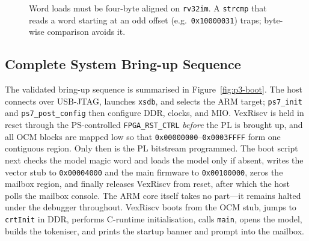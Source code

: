 \begin{figure}[H]
\centering
{}
\caption{Word loads must be four-byte aligned on \texttt{rv32im}. A \texttt{strcmp} that reads a word
starting at an odd offset (e.g.\ \texttt{0x10000031}) traps; byte-wise comparison avoids it.}
\label{fig:p3-trap}
\end{figure}

\subsection{Complete System Bring-up Sequence}

The validated bring-up sequence is summarised in Figure~\ref{fig:p3-boot}. The host connects over
USB-JTAG, launches \texttt{xsdb}, and selects the ARM target; \texttt{ps7\_init} and
\texttt{ps7\_post\_config} then configure DDR, clocks, and MIO. VexRiscv is held in reset through the
PS-controlled \texttt{FPGA\_RST\_CTRL} \emph{before} the PL is brought up, and all OCM blocks are
mapped low so that \texttt{0x00000000}--\texttt{0x0003FFFF} form one contiguous region. Only then is
the PL bitstream programmed. The boot script next checks the model magic word and loads the model
only if absent, writes the vector stub to \texttt{0x00004000} and the main firmware to
\texttt{0x00100000}, zeros the mailbox region, and finally releases VexRiscv from reset, after which
the host polls the mailbox console. The ARM core itself takes no part---it remains halted under the
debugger throughout. VexRiscv boots from the OCM stub, jumps to \texttt{crtInit} in DDR, performs
C-runtime initialisation, calls \texttt{main}, opens the model, builds the tokeniser, and prints the
startup banner and prompt into the mailbox.

